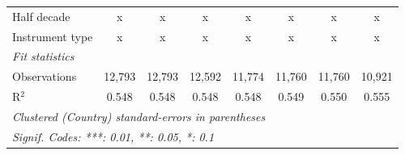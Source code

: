 \begin{tabular}{lccccccc}
   Half decade                                                                         & x            & x             & x            & x             & x             & x             & x\\  
   Instrument type                                                                     & x            & x             & x            & x             & x             & x             & x\\  
   \midrule \emph{Fit statistics}\\
   Observations                                                                        & 12,793       & 12,793        & 12,592       & 11,774        & 11,760        & 11,760        & 10,921\\  
   R$^2$                                                                               & 0.548        & 0.548         & 0.548        & 0.548         & 0.549         & 0.550         & 0.555\\  
   \midrule
   \multicolumn{8}{l}{\emph{Clustered (Country) standard-errors in parentheses}}\\
   \multicolumn{8}{l}{\emph{Signif. Codes: ***: 0.01, **: 0.05, *: 0.1}}\\
\end{tabular}
\par\endgroup



